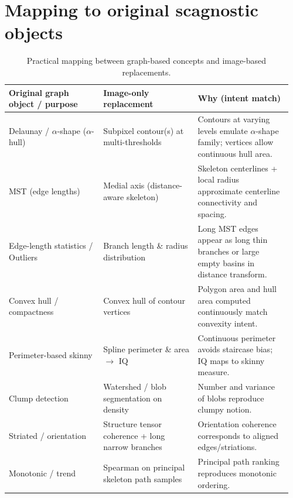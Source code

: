\documentclass[11pt]{article}
\begin{document}
\section{Mapping to original scagnostic objects}
\begin{table}[h]
\centering
\begin{tabular}{@{}p{0.32\linewidth}p{0.32\linewidth}p{0.32\linewidth}@{}}
\toprule
\textbf{Original graph object / purpose} & \textbf{Image-only replacement} & \textbf{Why (intent match)} \\
\midrule
Delaunay / $\alpha$-shape ($\alpha$-hull) & Subpixel contour(s) at multi-thresholds & Contours at varying levels emulate $\alpha$-shape family; vertices allow continuous hull area. \\
MST (edge lengths) & Medial axis (distance-aware skeleton) & Skeleton centerlines + local radius approximate centerline connectivity and spacing. \\
Edge-length statistics / Outliers & Branch length \& radius distribution & Long MST edges appear as long thin branches or large empty basins in distance transform. \\
Convex hull / compactness & Convex hull of contour vertices & Polygon area and hull area computed continuously match convexity intent. \\
Perimeter-based skinny & Spline perimeter \& area \(\rightarrow\) IQ & Continuous perimeter avoids staircase bias; IQ maps to skinny measure. \\
Clump detection & Watershed / blob segmentation on density & Number and variance of blobs reproduce clumpy notion. \\
Striated / orientation & Structure tensor coherence + long narrow branches & Orientation coherence corresponds to aligned edges/striations. \\
Monotonic / trend & Spearman on principal skeleton path samples & Principal path ranking reproduces monotonic ordering. \\
\bottomrule
\end{tabular}
\caption{Practical mapping between graph-based concepts and image-based replacements.}
\end{table}
\end{document}
